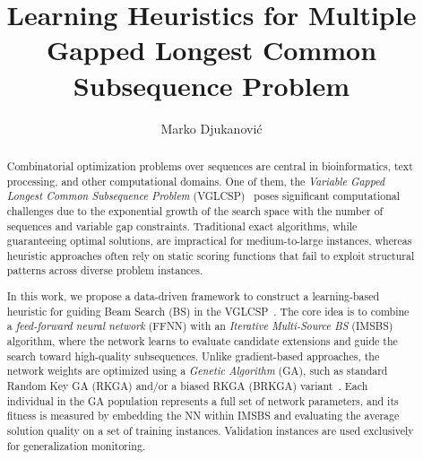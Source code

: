 \documentclass[runningheads]{llncs}
\begin{document}
	
	\title{Learning Heuristics for Multiple Gapped Longest Common Subsequence Problem}
	
	\author{Marko Djukanović 
	}
	
	\maketitle              %
 
	\vspace{-0.5cm}
    \begin{abstract}
    	Combinatorial optimization problems over sequences are central in bioinformatics, text processing, and other computational domains. One of  them, the \textit{Variable Gapped Longest Common Subsequence Problem} (VGLCSP)~\cite{penga2011longest} poses significant computational challenges due to the exponential growth of the search space with the number of sequences and variable gap constraints. Traditional exact algorithms, while guaranteeing optimal solutions, are impractical for medium-to-large instances, whereas heuristic approaches often rely on static scoring functions that fail to exploit structural patterns across diverse problem instances.
    	
    	In this work, we propose a data-driven framework to construct a learning-based heuristic for guiding Beam Search (BS) in the VGLCSP~\cite{djukanovic_eurocast_2026}. The core idea is to combine a \textit{feed-forward neural network} (FFNN) with an \textit{Iterative Multi-Source BS} (IMSBS) algorithm, where the network learns to evaluate candidate extensions and guide the search toward high-quality subsequences. Unlike gradient-based approaches, the network weights are optimized using a \textit{Genetic Algorithm} (GA), such as standard Random Key GA (RKGA) and/or a biased RKGA (BRKGA) variant~\cite{gonccalves2011biased}. Each individual in the GA population represents a full set of network parameters, and its fitness is measured by embedding the NN within IMSBS and evaluating the average solution quality on a set of training instances. Validation instances are used exclusively for generalization monitoring.
    	

\end{abstract}
\end{document}
